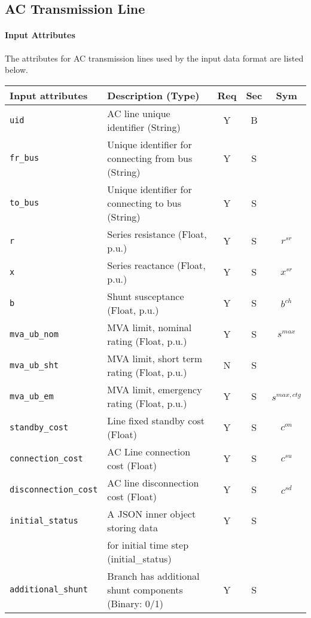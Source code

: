 \documentclass{article}
\begin{document}
\subsection{AC Transmission Line}
\label{nom:line}
\paragraph{Input Attributes}
The attributes for AC transmission lines used by the input data format are listed below.

\begin{center}
\small
\begin{tabular}{ l | l | c | c | c | }
Input attributes & Description (Type)& Req & Sec & Sym\\
\hline
  {\tt uid} & AC line unique identifier (String)& Y & B &  \\
  {\tt fr\_bus} & Unique identifier for connecting from bus (String)& Y & S & \\
  {\tt to\_bus} & Unique identifier for connecting to bus (String)& Y & S & \\
  {\tt r} & Series resistance (Float, p.u.)& Y & S & $r^{sr}$\\
  {\tt x} & Series reactance  (Float, p.u.)& Y & S & $x^{sr}$\\
  {\tt b} & Shunt susceptance (Float, p.u.)& Y & S & $b^{ch}$\\
  {\tt mva\_ub\_nom} & MVA limit, nominal rating (Float, p.u.)& Y & S & $s^{max}$\\
  {\tt mva\_ub\_sht} & MVA limit, short term rating (Float, p.u.)& N & S & \\
  {\tt mva\_ub\_em} & MVA limit, emergency rating (Float, p.u.)& Y & S & $s^{max,ctg}$\\
  {\tt standby\_cost} & Line fixed standby cost (Float) & Y & S & $c^{on}$\\
  {\tt connection\_cost} &  AC Line connection cost (Float) & Y & S & $c^{su}$\\
  {\tt disconnection\_cost} & AC line disconnection cost (Float) & Y & S & $c^{sd}$\\
  {\tt initial\_status} & A JSON inner object storing data  & Y & S &  \\
       & for initial time step (initial\_status) &  &  &  \\
  {\tt additional\_shunt} & Branch has additional shunt components (Binary: 0/1)& Y & S & \\

\end{tabular}
\end{center}
\end{document}
